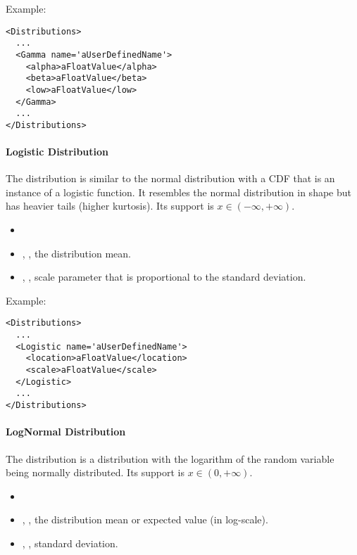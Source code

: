 Example:
\begin{lstlisting}[style=XML]
<Distributions>
  ...
  <Gamma name='aUserDefinedName'>
    <alpha>aFloatValue</alpha>
    <beta>aFloatValue</beta>
    <low>aFloatValue</low>
  </Gamma>
  ...
</Distributions>
\end{lstlisting}

\paragraph{Logistic Distribution}
\label{Logistic}
The  distribution is similar to the
normal distribution with a CDF that is an instance of a logistic function.
%
It resembles the normal distribution in shape but has heavier tails (higher
kurtosis).
%
Its support is $x \in (-\infty,+\infty)$.

%
\attrIntro
\vspace{-5mm}
\begin{itemize}
\itemsep0em
\item \nameDescription
\end{itemize}
\vspace{-5mm}
\subnodesIntro
\begin{itemize}
\item {}, , the distribution
  mean.
\item {}, , scale parameter that
  is proportional to the standard deviation.
\end{itemize}

Example:
\begin{lstlisting}[style=XML]
<Distributions>
  ...
  <Logistic name='aUserDefinedName'>
    <location>aFloatValue</location>
    <scale>aFloatValue</scale>
  </Logistic>
  ...
</Distributions>
\end{lstlisting}

\paragraph{LogNormal Distribution}
\label{LogNormal}
The  distribution is a distribution with the
logarithm of the random variable being normally distributed.
%
Its support is $x \in (0, +\infty)$.

%
\attrIntro
\vspace{-5mm}
\begin{itemize}
\itemsep0em
\item \nameDescription
\end{itemize}
\vspace{-5mm}
\subnodesIntro
\begin{itemize}
\item {}, , the distribution mean
or expected value (in log-scale).
\item {}, , standard deviation.
\end{itemize}

